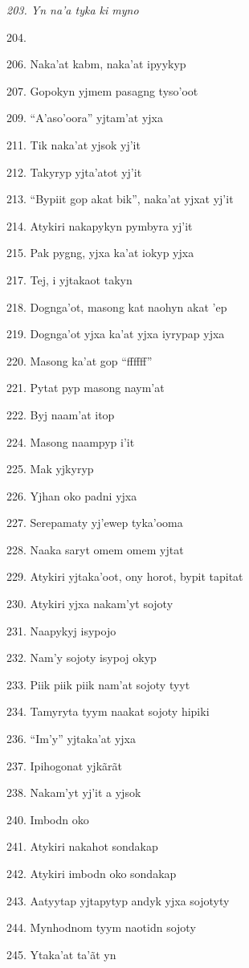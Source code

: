\emph{203. Yn na'a tyka ki myno}

204.

206. Naka'at kabm, naka'at ipyykyp

207. Gopokyn yjmem pasagng tyso'oot

209. ``A'aso'oora'' yjtam'at yjxa

211. Tik naka'at yjsok yj'it

212. Takyryp yjta'atot yj'it

213. ``Bypiit gop akat bik'', naka'at yjxat yj'it

214. Atykiri nakapykyn pymbyra yj'it

215. Pak pygng, yjxa ka'at iokyp yjxa

217. Tej, i yjtakaot takyn

218. Dognga'ot, masong kat naohyn akat 'ep

219. Dognga'ot yjxa ka'at yjxa iyrypap yjxa

220. Masong ka'at gop ``ffffff''

221. Pytat pyp masong naym'at

222. Byj naam'at itop

224. Masong naampyp i'it

225. Mak yjkyryp

226. Yjhan oko padni yjxa

227. Serepamaty yj'ewep tyka'ooma

228. Naaka saryt omem omem yjtat

229. Atykiri yjtaka'oot, ony horot, bypit tapitat

230. Atykiri yjxa nakam'yt sojoty

231. Naapykyj isypojo

232. Nam'y sojoty isypoj okyp

233. Piik piik piik nam'at sojoty tyyt

234. Tamyryta tyym naakat sojoty hipiki

236. ``Im'y'' yjtaka'at yjxa

237. Ipihogonat yjkãrãt

238. Nakam'yt yj'it a yjsok

240. Imbodn oko

241. Atykiri nakahot sondakap

242. Atykiri imbodn oko sondakap

243. Aatyytap yjtapytyp andyk yjxa sojotyty

244. Mynhodnom tyym naotidn sojoty

245. Ytaka'at ta'ãt yn

